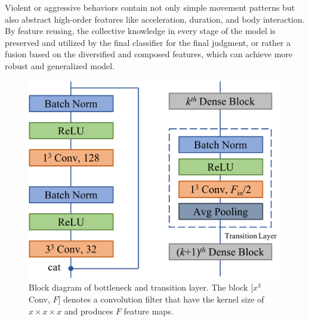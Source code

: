 \documentclass[10pt,twocolumn,letterpaper]{article}
\begin{document}
Violent or aggressive behaviors contain not only simple movement patterns but also abstract high-order features like acceleration, duration, and body interaction.  
By feature reusing, the collective knowledge in every stage of the model is preserved and utilized by the final classifier for the final judgment, or rather a fusion based on the diversified and composed features, which can achieve more robust and generalized model. 


\begin{figure}[t]
\begin{center}
\includegraphics[scale=0.30]{fig/fig2.png}
\end{center}
\caption{Block diagram of bottleneck and transition layer. The block [$x^3$ Conv, $F$] denotes a convolution filter that have the kernel size of $x \times x \times x$ and produces $F$ feature maps.}
\label{fig:bottleneck}
\end{figure}
\end{document}
